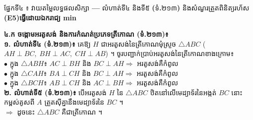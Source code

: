 \documentclass[a4paper,10pt]{article}
\newcommand{\en}[1]{{\TimesEn #1}}
\newcommand{\enbf}[1]{{\TimesEn\textbf{#1}}}
\newcommand{\blank}[1]{\makebox[#1]{\dotfill}}
\newcommand{\tri}[1]{\ensuremath{\triangle #1}}
\newcommand{\secbar}[2]{%
  \vspace{3pt}%
  \begin{tcolorbox}[
    enhanced, sharp corners, colback=headgray, colframe=black,
    boxrule=0.9pt, boxsep=1pt, top=2.5pt, bottom=2.5pt, left=6pt, right=6pt,
    after skip=3pt
  ]
    {\muol\fontsize{9.2pt}{13.5pt}\selectfont #1}\hfill{\fontsize{8.3pt}{11.5pt}\selectfont\textbf{#2}}
  \end{tcolorbox}%
}
\begin{document}
\vspace{2pt}
\secbar{ផ្នែកទី៤ ៖ វាយតម្លៃលទ្ធផលសិក្សា \enbf{---} លំហាត់ទី៤ និងទី៥ \enbf{(}ទំ\enbf{.}២១៣\enbf{)} និងសំណួរត្រួតពិនិត្យរហ័ស \enbf{(E5)}}{ធ្វើដោយឯករាជ្យ \en{10 min}}

\noindent
\begin{minipage}[t]{10.2cm}\vspace{0pt}
  \begin{tcolorbox}[
    enhanced, sharp corners, colback=white, colframe=black, equal height group=rowE5,
    boxrule=0.85pt, boxsep=2.2pt, top=3.5pt, bottom=3.5pt, left=5pt, right=5pt
  ]
    \textbf{៤.ក ចង្កោមអរតូសង់ និងការកំណត់ប្រភេទត្រីកោណ (ទំ.២១៣)៖}\\[2.5pt]
    \textbf{១. លំហាត់ទី៤ (ទំ.២១៣)៖} គេឱ្យ $H$ ជាអរតូសង់នៃត្រីកោណមុំស្រួច $\tri{ABC}$ ($AH\perp BC,\; BH\perp AC,\; CH\perp AB$) ។ ចូរបញ្ជាក់ប្រាប់អរតូសង់នៃត្រីកោណខាងក្រោម៖\\[3pt]
    \hspace*{0.15cm}$\bullet$ ក្នុង $\tri{ABH}$៖ $AC\perp BH$ និង $BC\perp AH \Rightarrow$ អរតូសង់គឺកំពូល \blank{0.9cm}\\[3pt]
    \hspace*{0.15cm}$\bullet$ ក្នុង $\tri{CAH}$៖ $BA\perp CH$ និង $BC\perp AH \Rightarrow$ អរតូសង់គឺកំពូល \blank{0.9cm}\\[3pt]
    \hspace*{0.15cm}$\bullet$ ក្នុង $\tri{BCH}$៖ $AB\perp CH$ និង $AC\perp BH \Rightarrow$ អរតូសង់គឺកំពូល \blank{0.9cm}\\[4pt]
    \textbf{២. លំហាត់ទី៥ (ទំ.២១៣)៖} បើអរតូសង់ $H$ នៃ $\tri{ABC}$ ឋិតនៅលើមេដ្យាទ័រនៃអង្កត់ $BC$ នោះកម្ពស់គូសពី $A$ ត្រួតស៊ីគ្នានឹងមេដ្យាទ័រនៃ $BC$ ។\\[2pt]
    $\Rightarrow$ ដូចនេះ $\tri{ABC}$ គឺជាត្រីកោណ \blank{4.5cm} ។
  \end{tcolorbox}
\end{minipage}%
\hfill
\end{document}
